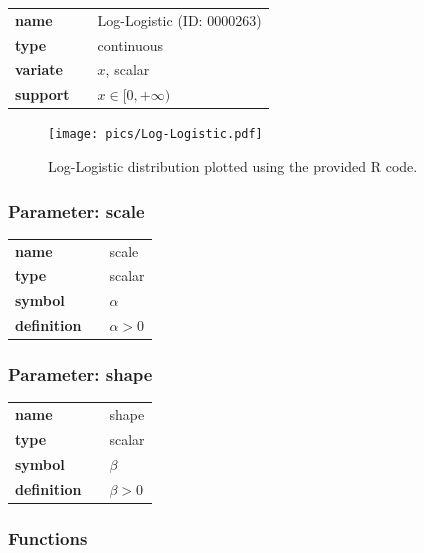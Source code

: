 \documentclass{article}
\begin{document}
  \bigskip 

\begin{tabular}{p{2cm}cl}
\textbf{name} & & Log-Logistic (ID: 0000263)\\ 
 
\textbf{type} & & continuous \\ 

\textbf{variate} & & $x$, scalar \\ 

\textbf{support} & & $x \in [0,+\infty)$
\end{tabular}

\begin{figure}[ht!]
\centering
  \texttt{[image: pics/Log-Logistic.pdf]}
 \caption{Log-Logistic distribution plotted using the provided R code.}
 \label{fig:Log-Logistic}
\end{figure}

\subsubsection*{Parameter: scale}

\noindent\begin{tabular}{p{2cm}cl}
\textbf{name} & & scale \\
\textbf{type} & & scalar \\
\textbf{symbol} & & $\alpha$  \\
\textbf{definition} & & $\alpha > 0$
\end{tabular}
\subsubsection*{Parameter: shape}

\noindent\begin{tabular}{p{2cm}cl}
\textbf{name} & & shape \\
\textbf{type} & & scalar \\
\textbf{symbol} & & $\beta$  \\
\textbf{definition} & & $\beta > 0$
\end{tabular}
\subsubsection*{Functions}
\end{document}

